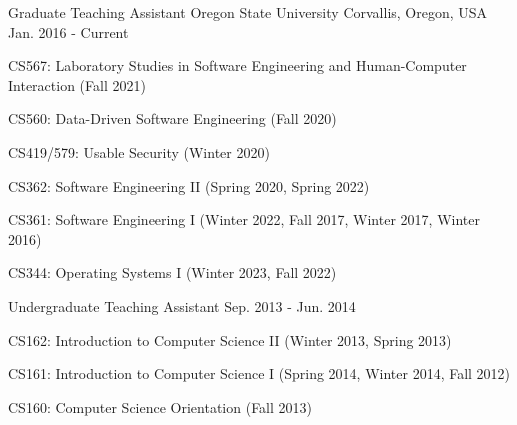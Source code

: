 

\begin{cventries}

  \cventry
    {Graduate Teaching Assistant} %
    {Oregon State University} %
    {Corvallis, Oregon, USA} %
    {Jan. 2016 - Current} %
    {
      \begin{cvitems} %
        \item {CS567: Laboratory Studies in Software Engineering and Human-Computer Interaction (Fall 2021)}
        \item {CS560: Data-Driven Software Engineering (Fall 2020)}
        \item {CS419/579: Usable Security (Winter 2020)}
        \item {CS362: Software Engineering II (Spring 2020, Spring 2022)}
        \item {CS361: Software Engineering I (Winter 2022, Fall 2017, Winter 2017, Winter 2016)}
        \item {CS344: Operating Systems I (Winter 2023, Fall 2022)}
      \end{cvitems}
    }

    \cventry
    {Undergraduate Teaching Assistant} %
    {} %
    {} %
    {Sep. 2013 - Jun. 2014} %
    {
      \begin{cvitems} %
        \item {CS162: Introduction to Computer Science II (Winter 2013, Spring 2013)}
        \item {CS161: Introduction to Computer Science I (Spring 2014, Winter 2014, Fall 2012)}
        \item {CS160: Computer Science Orientation (Fall 2013)}
      \end{cvitems}
    }

\end{cventries}
